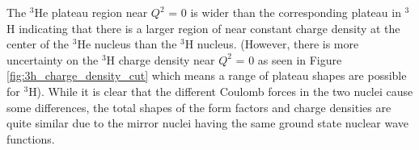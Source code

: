 The $^3$He plateau region near $Q^2$ = 0 is wider than the corresponding plateau in $^3$H indicating that there is a larger region of near constant charge density at the center of the $^3$He nucleus than the $^3$H nucleus. (However, there is more uncertainty on the $^3$H charge density near $Q^2$ = 0 as seen in Figure \ref{fig:3h_charge_density_cut} which means a range of plateau shapes are possible for $^3$H). While it is clear that the different Coulomb forces in the two nuclei cause some differences, the total shapes of the form factors and charge densities are quite similar due to the mirror nuclei having the same ground state nuclear wave functions. 